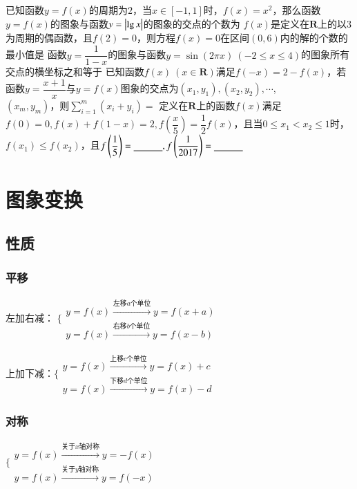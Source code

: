 \documentclass{BHCexam}
\begin{document}
\begin{questions}
\qs 已知函数$y=f(x)$的周期为$ 2 $，当$ x\in\left[-1,1\right] $时，$ f(x)=x^2 $，那么函数$y=f(x)$的图象与函数$ y=\left|\lg x\right| $的图象的交点的个数为\xx
{} 
\qs $f(x)$是定义在$\mathbf{R}$上的以$ 3 $为周期的偶函数，且$ f(2)=0 $，则方程$ f(x)=0 $在区间$ \left(0,6\right) $内的解的个数的最小值是\xx
{}
\qs 函数$ y=\dfrac{1}{1-x} $的图象与函数$ y=\sin\left(2\pi x\right)~(-2\le x\le 4) $的图象所有交点的横坐标之和等于\xx
{}  
\qs 已知函数$f(x)~(x\in \mathbf{R})$满足$f(-x)=2-f(x)$，若函数$y=\dfrac{x+1}{x}$与$y=f(x)$图象的交点为$(x_1,y_1),(x_2,y_2),\cdots$,\\$(x_m,y_m)$，则$\sum\limits_{i=1}^{m}(x_i+y_i)=$\xx
{}
\qs 定义在$\mathbf{R}$上的函数$f(x)$满足$ f(0)=0,f(x)+f(1-x)=2,f\left(\dfrac{x}{5}\right)=\dfrac{1}{2} f(x)$，且当$ 0\le x_1<x_2\le1 $时，$ f(x_1)\le f(x_2) $，且$ f\left(\dfrac{1}{5}\right)=\underline{\hspace{3em}},f\left(\dfrac{1}{2017}\right)=\underline{\hspace{3em}} $
\end{questions}
\newpage


\section{图象变换}
\subsection{性质}
\subsubsection{平移}
左加右减：
$\Bigg\{\begin{aligned}
y=f(x)\xrightarrow{\text{左移}a\text{个单位}}y=f(x+a)\\
y=f(x)\xrightarrow{\text{右移}b\text{个单位}}y=f(x-b)
\end{aligned}$\par 
上加下减：$\Bigg\{\begin{aligned}
y=f(x)\xrightarrow{\text{上移}c\text{个单位}}y=f(x)+c\\
y=f(x)\xrightarrow{\text{下移}d\text{个单位}}y=f(x)-d
\end{aligned}$
\subsubsection{对称}
$\Bigg\{\begin{aligned}
y=f(x)\xrightarrow{\text{关于}x\text{轴对称}}y=-f(x)\\
y=f(x)\xrightarrow{\text{关于}y\text{轴对称}}y=f(-x)
\end{aligned}$
\end{document}
